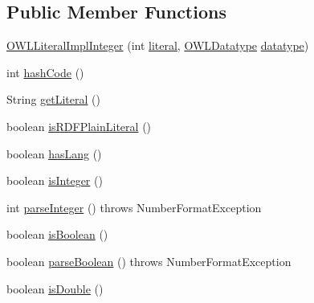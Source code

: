 \subsection*{Public Member Functions}
\begin{DoxyCompactItemize}
\item 
\hyperlink{classuk_1_1ac_1_1manchester_1_1cs_1_1owl_1_1owlapi_1_1_o_w_l_literal_impl_integer_afd0c74c5f4d1349e72786b896e602898}{O\-W\-L\-Literal\-Impl\-Integer} (int \hyperlink{classuk_1_1ac_1_1manchester_1_1cs_1_1owl_1_1owlapi_1_1_o_w_l_literal_impl_integer_a498ac09735c90af8cec19e67dbecb487}{literal}, \hyperlink{interfaceorg_1_1semanticweb_1_1owlapi_1_1model_1_1_o_w_l_datatype}{O\-W\-L\-Datatype} \hyperlink{classuk_1_1ac_1_1manchester_1_1cs_1_1owl_1_1owlapi_1_1_o_w_l_literal_impl_integer_a0b5d743acd63ccb7fe6dbee958224ef6}{datatype})
\item 
int \hyperlink{classuk_1_1ac_1_1manchester_1_1cs_1_1owl_1_1owlapi_1_1_o_w_l_literal_impl_integer_a8d840c6918f789500323cb61069fc698}{hash\-Code} ()
\item 
String \hyperlink{classuk_1_1ac_1_1manchester_1_1cs_1_1owl_1_1owlapi_1_1_o_w_l_literal_impl_integer_a90c4e02cae6e717f066af6a9bf2ae0c2}{get\-Literal} ()
\item 
boolean \hyperlink{classuk_1_1ac_1_1manchester_1_1cs_1_1owl_1_1owlapi_1_1_o_w_l_literal_impl_integer_ad0f663b700744bfa3054b5f9dfa8d483}{is\-R\-D\-F\-Plain\-Literal} ()
\item 
boolean \hyperlink{classuk_1_1ac_1_1manchester_1_1cs_1_1owl_1_1owlapi_1_1_o_w_l_literal_impl_integer_a955d21dc3a1147845442ffe6636f5cf8}{has\-Lang} ()
\item 
boolean \hyperlink{classuk_1_1ac_1_1manchester_1_1cs_1_1owl_1_1owlapi_1_1_o_w_l_literal_impl_integer_a628ed5d722fe0977f7af4a6d806df5ad}{is\-Integer} ()
\item 
int \hyperlink{classuk_1_1ac_1_1manchester_1_1cs_1_1owl_1_1owlapi_1_1_o_w_l_literal_impl_integer_a4361afc596a12c0984276bdebb91c32a}{parse\-Integer} ()  throws Number\-Format\-Exception 
\item 
boolean \hyperlink{classuk_1_1ac_1_1manchester_1_1cs_1_1owl_1_1owlapi_1_1_o_w_l_literal_impl_integer_a05689f4546d873bbbae4859a862e3653}{is\-Boolean} ()
\item 
boolean \hyperlink{classuk_1_1ac_1_1manchester_1_1cs_1_1owl_1_1owlapi_1_1_o_w_l_literal_impl_integer_a83c0efa0d4566c1b5437bf23a8fe8cae}{parse\-Boolean} ()  throws Number\-Format\-Exception 
\item 
boolean \hyperlink{classuk_1_1ac_1_1manchester_1_1cs_1_1owl_1_1owlapi_1_1_o_w_l_literal_impl_integer_a8c90727aa40880d670adbc16fb8fdc8e}{is\-Double} ()

\end{DoxyCompactItemize}

